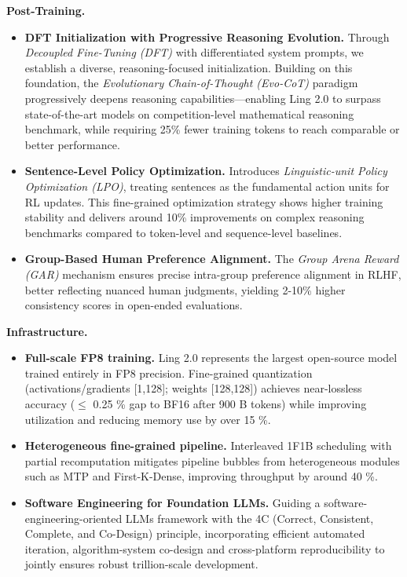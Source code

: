 \documentclass[table]{gtech}
\theoremstyle{definition}
\newcommand{\paratitle}[1]{\vspace{1.5ex}\noindent\textbf{#1}}
\begin{document}
\paratitle{Post-Training.} 
\begin{itemize}
  \item \textbf{DFT Initialization with Progressive Reasoning Evolution.} Through \textit{Decoupled Fine-Tuning (DFT)} with differentiated system prompts, we establish a diverse, reasoning-focused initialization. Building on this foundation, the \textit{Evolutionary Chain-of-Thought (Evo-CoT)} paradigm progressively deepens reasoning capabilities—enabling Ling 2.0 to surpass state-of-the-art models on competition-level mathematical reasoning benchmark, while requiring 25\% fewer training tokens to reach comparable or better performance.
  \item \textbf{Sentence-Level Policy Optimization.} Introduces \textit{Linguistic-unit Policy Optimization (LPO)}, treating sentences as the fundamental action units for RL updates. This fine-grained optimization strategy shows higher training stability and delivers around 10\% improvements on complex reasoning benchmarks compared to token-level and sequence-level baselines. 
  \item  \textbf{Group-Based Human Preference Alignment.} The \textit{Group Arena Reward (GAR)} mechanism ensures precise intra-group preference alignment in RLHF, better reflecting nuanced human judgments, yielding 2-10\% higher consistency scores in open-ended evaluations.
\end{itemize}

\paratitle{Infrastructure.} 
\begin{itemize}
  \item \textbf{Full-scale FP8 training.} Ling 2.0 represents the largest open-source model trained entirely in FP8 precision. Fine-grained quantization (activations/gradients [1,128]; weights [128,128]) achieves near-lossless accuracy ($\leq$ 0.25 \% gap to BF16 after 900 B tokens) while improving utilization and reducing memory use by over 15 \%.  
  \item \textbf{Heterogeneous fine-grained pipeline.} Interleaved 1F1B scheduling with partial recomputation mitigates pipeline bubbles from heterogeneous modules such as MTP and First-K-Dense, improving throughput by around 40 \%.  
  \item \textbf{Software Engineering for Foundation LLMs.} Guiding a software-engineering-oriented LLMs framework with the 4C (Correct, Consistent, Complete, and Co-Design) principle, incorporating efficient automated iteration, algorithm-system co-design and cross-platform reproducibility to jointly ensures robust trillion-scale development.
\end{itemize}
\end{document}
